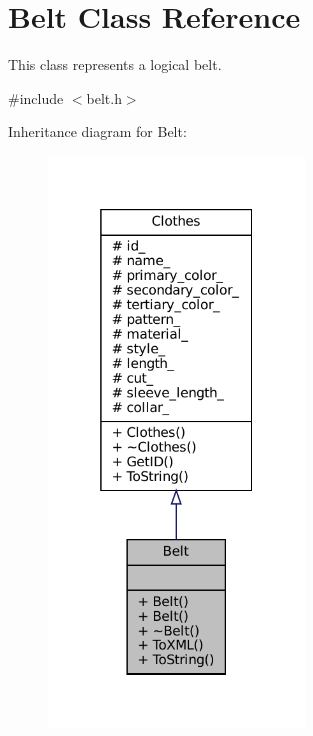 \hypertarget{classBelt}{}\section{Belt Class Reference}
\label{classBelt}


This class represents a logical belt.  




{\ttfamily \#include $<$belt.\+h$>$}



Inheritance diagram for Belt\+:\nopagebreak
\begin{figure}[H]
\begin{center}
\leavevmode
\includegraphics[width=193pt]{classBelt__inherit__graph}
\end{center}
\end{figure}


